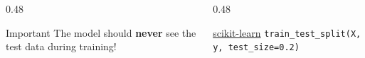 \documentclass[aspectratio=169, 10pt]{beamer}
\begin{document}
\begin{frame}
    \vspace{2mm}
    \begin{columns}[T]
        \begin{column}{0.48\textwidth}
            \begin{alertblock}{\footnotesize Important}
                \footnotesize The model should \textbf{never} see the test data during training!
            \end{alertblock}
        \end{column}
        \begin{column}{0.48\textwidth}
            \begin{block}{\footnotesize \href{https://scikit-learn.org/stable/modules/generated/sklearn.model_selection.train_test_split.html}{scikit-learn}}
                \footnotesize \texttt{train\_test\_split(X, y, test\_size=0.2)}
            \end{block}
        \end{column}
    \end{columns}

\end{frame}
\end{document}
